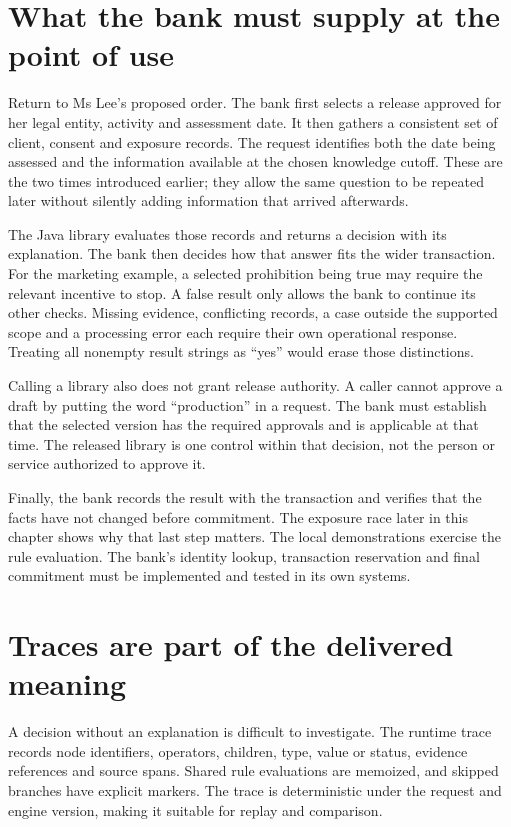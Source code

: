 \documentclass[12pt,a4paper,oneside,openany]{book}
\begin{document}
\section{What the bank must supply at the point of use}
\label{sec:reader-java-use}

Return to Ms Lee's proposed order. The bank first selects a release approved for
her legal entity, activity and assessment date. It then gathers a consistent set
of client, consent and exposure records. The request identifies both the date
being assessed and the information available at the chosen knowledge cutoff.
These are the two times introduced earlier; they allow the same question to be
repeated later without silently adding information that arrived afterwards.

The Java library evaluates those records and returns a decision with its
explanation. The bank then decides how that answer fits the wider transaction.
For the marketing example, a selected prohibition being true may require the
relevant incentive to stop. A false result only allows the bank to continue its
other checks. Missing evidence, conflicting records, a case outside the supported
scope and a processing error each require their own operational response. Treating
all nonempty result strings as ``yes'' would erase those distinctions.

Calling a library also does not grant release authority. A caller cannot approve
a draft by putting the word ``production'' in a request. The bank must establish
that the selected version has the required approvals and is applicable at that
time. The released library is one control within that decision, not the person
or service authorized to approve it.

Finally, the bank records the result with the transaction and verifies that the
facts have not changed before commitment. The exposure race later in this chapter
shows why that last step matters. The local demonstrations exercise the rule
evaluation. The bank's identity lookup, transaction reservation and final
commitment must be implemented and tested in its own systems.


\section{Traces are part of the delivered meaning}
\label{merge:M07:10}


A decision without an explanation is difficult to investigate. The runtime trace
records node identifiers, operators, children, type, value or status, evidence
references and source spans. Shared rule evaluations are memoized, and skipped
branches have explicit markers. The trace is deterministic under the request and
engine version, making it suitable for replay and comparison.
\end{document}
